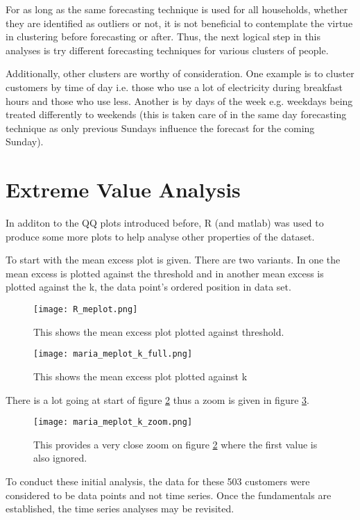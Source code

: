 \documentclass[a4paper]{article}
\begin{document}
For as long as the same forecasting technique is used for all households, whether they are identified as outliers or not, it is not beneficial to contemplate the virtue in clustering before forecasting or after. Thus, the next logical step in this analyses is try different forecasting techniques for various clusters of people.

Additionally, other clusters are worthy of consideration. One example is to cluster customers by time of day  i.e. those who use a lot of electricity during breakfast hours and those who use less. Another is by days of the week e.g. weekdays being treated differently to weekends (this is taken care of in the same day forecasting technique as only previous Sundays influence the forecast for the coming Sunday).

\section*{Extreme Value Analysis}
In additon to the QQ plots introduced before, R (and matlab) was used to produce some more plots to help analyse other properties of the dataset.

To start with the mean excess plot is given. There are two variants. In one the mean excess is plotted against the threshold and in another mean excess is plotted against the k, the data point's ordered position in data set.

\begin{figure}
\centering
\texttt{[image: R\_meplot.png]}
\caption{\label{fig:r_me} This shows the mean excess plot plotted against threshold.}
\end{figure}

\begin{figure}
\centering
\texttt{[image: maria\_meplot\_k\_full.png]}
\caption{\label{fig:me_k_full} This shows the mean excess plot plotted against k}
\end{figure}

There is a lot going at start of figure \ref{fig:me_k_full} thus a zoom is given in figure \ref{fig:me_k_zoom}.

\begin{figure}
\centering
\texttt{[image: maria\_meplot\_k\_zoom.png]}
\caption{\label{fig:me_k_zoom} This provides a very close zoom on figure \ref{fig:me_k_full} where the first value is also ignored.}
\end{figure}

To conduct these initial analysis, the data for these 503 customers were considered to be data points and not time series. Once the fundamentals are established, the time series analyses may be revisited.
\end{document}
